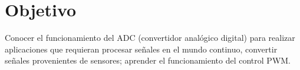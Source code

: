 \section{Objetivo}
Conocer el funcionamiento del ADC (convertidor analógico digital) para realizar aplicaciones que requieran procesar señales en el mundo continuo, convertir señales provenientes de sensores; aprender el funcionamiento del control PWM.
